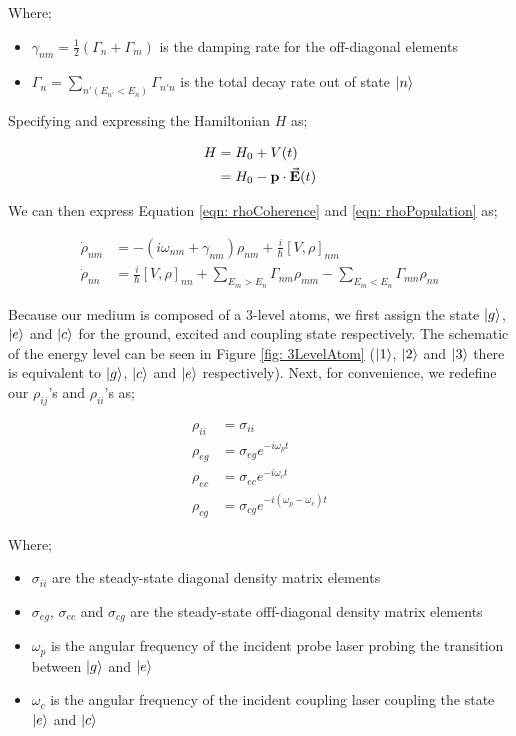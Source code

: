 Where;

\begin{itemize}
    \item $\gamma_{nm} = \frac{1}{2} (\Gamma_{n} + \Gamma_{m})$ is the damping rate for the off-diagonal elements
    \item $\Gamma_{n} = \sum_{n'(E_{n'} < E_{n})} \Gamma_{n'n}$ is the total decay rate out of state $\ket{n}$
\end{itemize}

Specifying and expressing the Hamiltonian $H$ as;

\begin{align}
    H &= H_{0} + V(t)\\
            &= H_{0} - \vb{p} \cdot \va{E}(t)
\end{align}

We can then express Equation \ref{eqn: rhoCoherence} and \ref{eqn: rhoPopulation} as;

\begin{align}
    \Dot{\rho}_{nm} &= -(i\omega_{nm} + \gamma_{nm}) \rho_{nm} + \frac{i}{\hbar} [V, \rho]_{nm} \label{eqn: rhoCohNew}\\
    \Dot{\rho}_{nn} &= \frac{i}{\hbar} [V, \rho]_{nn} + \sum_{E_{m} > E_{n}} \Gamma_{nm}\rho_{mm} - \sum_{E_{m} < E_{n}} \Gamma_{mn} \rho_{nn} \label{eqn: rhoPopNew}
\end{align}

Because our medium is composed of a 3-level atoms, we first assign the state $\ket{g}$, $\ket{e}$ and $\ket{c}$ for the ground, excited and coupling state respectively. The schematic of the energy level can be seen in Figure \ref{fig: 3LevelAtom} \cite{jeong2010slow} ($\ket{1}$, $\ket{2}$ and $\ket{3}$ there is equivalent to $\ket{g}$, $\ket{c}$ and $\ket{e}$ respectively). Next, for convenience, we redefine our $\rho_{ij}$'s and $\rho_{ii}$'s as;

\begin{align}
    \rho_{ii} &= \sigma_{ii} \label{eqn: rhoFirst}\\
    \rho_{eg} &= \sigma_{eg} e^{-i \omega_{p} t}\\
    \rho_{ec} &= \sigma_{ec} e^{-i \omega_{c} t}\\
    \rho_{cg} &= \sigma_{cg} e^{-i (\omega_{p} - \omega_{c}) t} \label{eqn: rhoLast}
\end{align}

Where;

\begin{itemize}
    \item $\sigma_{ii}$ are the steady-state diagonal density matrix elements
    \item $\sigma_{eg}$, $\sigma_{ec}$ and $\sigma_{cg}$ are the steady-state offf-diagonal density matrix elements
    \item $\omega_{p}$ is the angular frequency of the incident probe laser probing the transition between $\ket{g}$ and $\ket{e}$
    \item $\omega_{c}$ is the angular frequency of the incident coupling laser coupling the state $\ket{e}$ and $\ket{c}$
\end{itemize}

